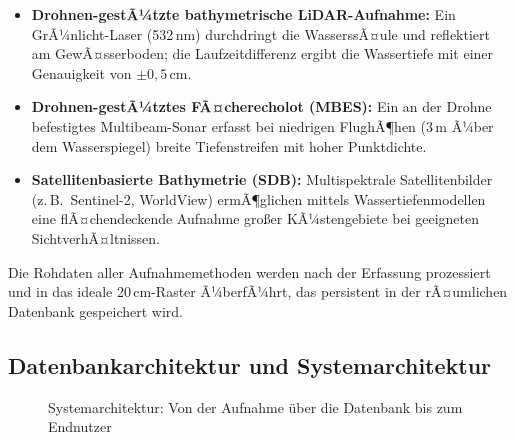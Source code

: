 ﻿\documentclass[a4paper,12pt]{article}
\theoremstyle{definition}
\begin{document}
\begin{itemize}
  \item \textbf{Drohnen-gestÃ¼tzte bathymetrische LiDAR-Aufnahme:} Ein GrÃ¼nlicht-Laser
        (532\,nm) durchdringt die WasserssÃ¤ule und reflektiert am GewÃ¤sserboden; die
        Laufzeitdifferenz ergibt die Wassertiefe mit einer Genauigkeit von $\pm 0{,}5\,\text{cm}$.
  \item \textbf{Drohnen-gestÃ¼tztes FÃ¤cherecholot (MBES):} Ein an der Drohne befestigtes
        Multibeam-Sonar erfasst bei niedrigen FlughÃ¶hen (3\,m Ã¼ber dem Wasserspiegel)
        breite Tiefenstreifen mit hoher Punktdichte.
  \item \textbf{Satellitenbasierte Bathymetrie (SDB):} Multispektrale Satellitenbilder
        (z.\,B.\ Sentinel-2, WorldView) ermÃ¶glichen mittels Wassertiefenmodellen eine
        flÃ¤chendeckende Aufnahme gro\ss{}er KÃ¼stengebiete bei geeigneten SichtverhÃ¤ltnissen.
\end{itemize}

\noindent
Die Rohdaten aller Aufnahmemethoden werden nach der Erfassung prozessiert und in das
ideale 20\,cm-Raster Ã¼berfÃ¼hrt, das persistent in der rÃ¤umlichen Datenbank gespeichert wird.

\subsection{Datenbankarchitektur und Systemarchitektur}

\begin{figure}[h]
\centering
{}
\caption{Systemarchitektur: Von der Aufnahme \"{u}ber die Datenbank bis zum Endnutzer}
\label{fig:architektur}
\end{figure}
\end{document}
